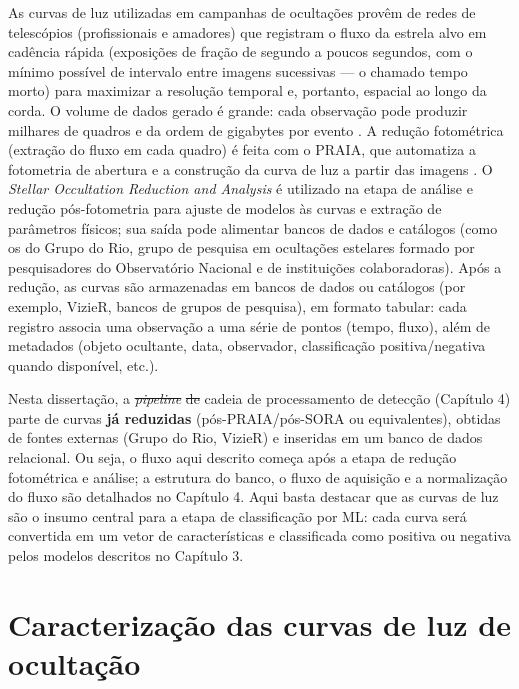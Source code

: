 \documentclass[msc]{on} %
\makeatletter
\providecommand{\DIFaddtex}[1]{{\protect\color{red}#1}} %
\providecommand{\DIFdeltex}[1]{{\protect\color{red}\sout{#1}}} %
\providecommand{\DIFaddbegin}{} %
\providecommand{\DIFaddend}{} %
\providecommand{\DIFdelbegin}{} %
\providecommand{\DIFdelend}{} %
\providecommand{\DIFadd}[1]{\texorpdfstring{\DIFaddtex{#1}}{#1}} %
\providecommand{\DIFdel}[1]{\texorpdfstring{\DIFdeltex{#1}}{}} %
\let\sout@orig\sout %
\renewcommand{\sout}[1]{\ifmmode\text{\sout@orig{\ensuremath{#1}}}\else\sout@orig{#1}\fi} %
\makeatother
\begin{document}
As curvas de luz utilizadas em campanhas de ocultações provêm de redes de telescópios (profissionais e amadores) que registram o fluxo da estrela alvo em cadência rápida (exposições de fração de segundo a poucos segundos, com o mínimo possível de intervalo entre imagens sucessivas --- o chamado tempo morto) para maximizar a resolução temporal e, portanto, espacial ao longo da corda. O volume de dados gerado é grande: cada observação pode produzir milhares de quadros e da ordem de gigabytes por evento \citep{Cazeneuve2023}. A redução fotométrica (extração do fluxo em cada quadro) é feita com o PRAIA, que automatiza a fotometria de abertura e a construção da curva de luz a partir das imagens \citep{Assafin2023}. O \textit{Stellar Occultation Reduction and Analysis} \citep[SORA,][]{SORA2022} é utilizado na etapa de análise e redução pós-fotometria para ajuste de modelos às curvas e extração de parâmetros físicos; sua saída pode alimentar bancos de dados e catálogos (como os do Grupo do Rio\DIFaddbegin \DIFadd{, grupo de pesquisa em ocultações estelares formado por pesquisadores do Observatório Nacional e de instituições colaboradoras}\DIFaddend ). Após a redução, as curvas são armazenadas em bancos de dados ou catálogos (por exemplo, VizieR, bancos de grupos de pesquisa), em formato tabular: cada registro associa uma observação a uma série de pontos (tempo, fluxo), além de metadados (objeto ocultante, data, observador, classificação positiva/negativa quando disponível, etc.).

Nesta dissertação, a \DIFdelbegin \textit{\DIFdel{pipeline}} %
\DIFdel{de }\DIFdelend\ifhmode\hskip0pt\fi \DIFaddbegin \DIFadd{cadeia de processamento de }\DIFaddend detecção (Capítulo 4) parte de curvas \textbf{já reduzidas} (pós-PRAIA/pós-SORA ou equivalentes), obtidas de fontes externas (Grupo do Rio, VizieR) e inseridas em um banco de dados relacional. Ou seja, o fluxo aqui descrito começa após a etapa de redução fotométrica e análise; a estrutura do banco, o fluxo de aquisição e a normalização do fluxo são detalhados no Capítulo 4. Aqui basta destacar que as curvas de luz são o insumo central para a etapa de classificação por ML: cada curva será convertida em um vetor de características e classificada como positiva ou negativa pelos modelos descritos no Capítulo 3.

\section{Caracterização das curvas de luz de ocultação}
\label{sec:caracteristicas_curvas}
\end{document}

